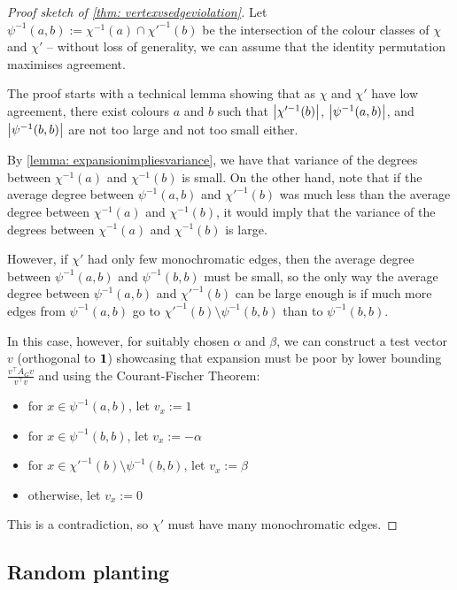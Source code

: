 \begin{proof}[Proof sketch of \cref{thm: vertexvsedgeviolation}]
    Let $\psi^{-1}(a, b) := \chi^{-1}(a) \cap \chi'^{-1}(b)$ be the intersection of the colour classes of $\chi$ and $\chi'$ -- without loss of generality, we can assume that the identity permutation maximises agreement. 

    The proof starts with a technical lemma showing that as $\chi$ and $\chi'$ have low agreement, there exist colours $a$ and $b$ such that $\left\lvert\chi'^{-1}(b)\right\rvert$, $\left\lvert\psi^{-1}(a, b)\right\rvert$, and $\left\lvert\psi^{-1}(b, b)\right\rvert$ are not too large and not too small either.

    By \cref{lemma: expansionimpliesvariance}, we have that variance of the degrees between $\chi^{-1}(a)$ and $\chi^{-1}(b)$ is small. On the other hand, note that if the average degree between $\psi^{-1}(a, b)$ and $\chi'^{-1}(b)$ was much less than the average degree between $\chi^{-1}(a)$ and $\chi^{-1}(b)$, it would imply that the variance of the degrees between $\chi^{-1}(a)$ and $\chi^{-1}(b)$ is large.
    
    However, if $\chi'$ had only few monochromatic edges, then the average degree between $\psi^{-1}(a, b)$ and $\psi^{-1}(b, b)$ must be small, so the only way the average degree between $\psi^{-1}(a, b)$ and $\chi'^{-1}(b)$ can be large enough is if much more edges from $\psi^{-1}(a, b)$ go to $\chi'^{-1}(b) \setminus \psi^{-1}(b, b)$ than to $\psi^{-1}(b, b)$.

    In this case, however, for suitably chosen $\alpha$ and $\beta$, we can construct a test vector $v$ (orthogonal to $\mathbf{1}$) showcasing that expansion must be poor by lower bounding $\frac{v^\top A_G v}{v^\top v}$ and using the Courant-Fischer Theorem:

    \begin{itemize}
        \item for $x \in \psi^{-1}(a, b)$, let $v_x := 1$
        \item for $x \in \psi^{-1}(b, b)$, let $v_x := -\alpha$
        \item for $x \in \chi'^{-1}(b) \setminus \psi^{-1}(b, b)$, let $v_x := \beta$
        \item otherwise, let $v_x := 0$
    \end{itemize}

    This is a contradiction, so $\chi'$ must have many monochromatic edges.
\end{proof}


\subsection{Random planting}


